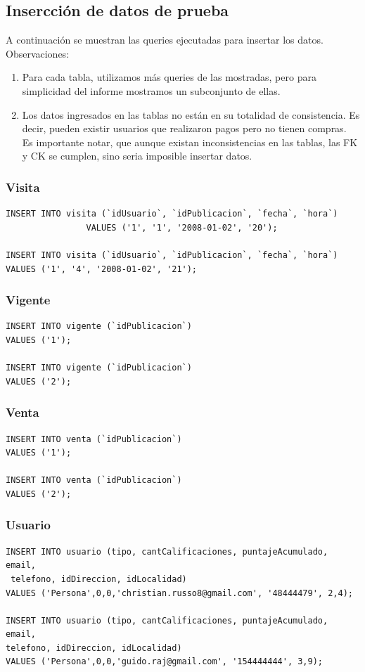 \documentclass[a4paper, 10pt, twoside]{article}
\begin{document}
\subsection{Insercci\'on de datos de prueba}

A continuaci\'on se muestran las queries ejecutadas para insertar los datos.
Observaciones:
\begin{enumerate}
\item Para cada tabla, utilizamos m\'as queries de las mostradas, pero para simplicidad del informe mostramos un subconjunto de ellas.
\item Los datos ingresados en las tablas no est\'an en su totalidad de consistencia. Es decir, pueden existir usuarios que realizaron pagos pero no tienen compras. Es importante notar, que aunque existan inconsistencias en las tablas, las FK y CK se cumplen, sino seria imposible insertar datos.

\end{enumerate}
\subsubsection{Visita}
\begin{verbatim}
INSERT INTO visita (`idUsuario`, `idPublicacion`, `fecha`, `hora`) 
				VALUES ('1', '1', '2008-01-02', '20');
				
INSERT INTO visita (`idUsuario`, `idPublicacion`, `fecha`, `hora`) 
VALUES ('1', '4', '2008-01-02', '21');
\end{verbatim}
\subsubsection{Vigente}
\begin{verbatim}
INSERT INTO vigente (`idPublicacion`) 
VALUES ('1');

INSERT INTO vigente (`idPublicacion`) 
VALUES ('2');
\end{verbatim}
\subsubsection{Venta}
\begin{verbatim}
INSERT INTO venta (`idPublicacion`) 
VALUES ('1');

INSERT INTO venta (`idPublicacion`) 
VALUES ('2');
\end{verbatim}
\subsubsection{Usuario}
\begin{verbatim}
INSERT INTO usuario (tipo, cantCalificaciones, puntajeAcumulado, email,
 telefono, idDireccion, idLocalidad) 
VALUES ('Persona',0,0,'christian.russo8@gmail.com', '48444479', 2,4);

INSERT INTO usuario (tipo, cantCalificaciones, puntajeAcumulado, email, 
telefono, idDireccion, idLocalidad)
VALUES ('Persona',0,0,'guido.raj@gmail.com', '154444444', 3,9);
\end{verbatim}
\end{document}
